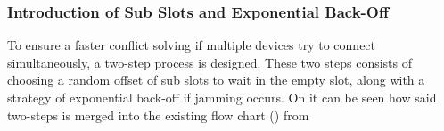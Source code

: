 \subsubsection{Introduction of Sub Slots and Exponential Back-Off} %
\label{ssub:introduction_of_sub_slots_and_exponential_backoff}
To ensure a faster conflict solving if multiple devices try to connect simultaneously, a two-step process is designed.
These two steps consists of choosing a random offset of sub slots to wait in the empty slot, along with a strategy of exponential back-off if jamming occurs.
On  it can be seen how said two-steps is merged into the existing flow chart () from 



